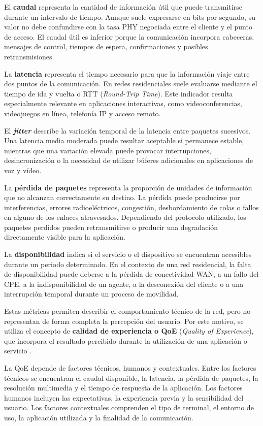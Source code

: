 El \textbf{caudal} representa la cantidad de información útil que puede
transmitirse durante un intervalo de tiempo. Aunque suele expresarse en
bits por segundo, su valor no debe confundirse con la tasa PHY negociada
entre el cliente y el punto de acceso. El caudal útil es inferior porque
la comunicación incorpora cabeceras, mensajes de control, tiempos de
espera, confirmaciones y posibles retransmisiones.

La \textbf{latencia} representa el tiempo necesario para que la
información viaje entre dos puntos de la comunicación. En redes
residenciales suele evaluarse mediante el tiempo de ida y vuelta o RTT
(\textit{Round-Trip Time}). Este indicador resulta especialmente
relevante en aplicaciones interactivas, como videoconferencias,
videojuegos en línea, telefonía IP y acceso remoto.

El \textbf{\textit{jitter}} describe la variación temporal de la
latencia entre paquetes sucesivos. Una latencia media moderada puede
resultar aceptable si permanece estable, mientras que una variación
elevada puede provocar interrupciones, desincronización o la necesidad de
utilizar búferes adicionales en aplicaciones de voz y vídeo.

La \textbf{pérdida de paquetes} representa la proporción de unidades de
información que no alcanzan correctamente su destino. La pérdida puede
producirse por interferencias, errores radioeléctricos, congestión,
desbordamiento de colas o fallos en alguno de los enlaces atravesados.
Dependiendo del protocolo utilizado, los paquetes perdidos pueden
retransmitirse o producir una degradación directamente visible para la
aplicación.

La \textbf{disponibilidad} indica si el servicio o el dispositivo se
encuentran accesibles durante un periodo determinado. En el contexto de
una red residencial, la falta de disponibilidad puede deberse a la
pérdida de conectividad WAN, a un fallo del CPE, a la indisponibilidad de
un agente, a la desconexión del cliente o a una interrupción temporal
durante un proceso de movilidad.

Estas métricas permiten describir el comportamiento técnico de la red,
pero no representan de forma completa la percepción del usuario. Por
este motivo, se utiliza el concepto de
\textbf{calidad de experiencia o QoE}
(\textit{Quality of Experience}), que incorpora el resultado percibido
durante la utilización de una aplicación o servicio
\cite{itu_p10_g100}.

La QoE depende de factores técnicos, humanos y contextuales. Entre los
factores técnicos se encuentran el caudal disponible, la latencia, la
pérdida de paquetes, la resolución multimedia y el tiempo de respuesta de
la aplicación. Los factores humanos incluyen las expectativas, la
experiencia previa y la sensibilidad del usuario. Los factores
contextuales comprenden el tipo de terminal, el entorno de uso, la
aplicación utilizada y la finalidad de la comunicación.

